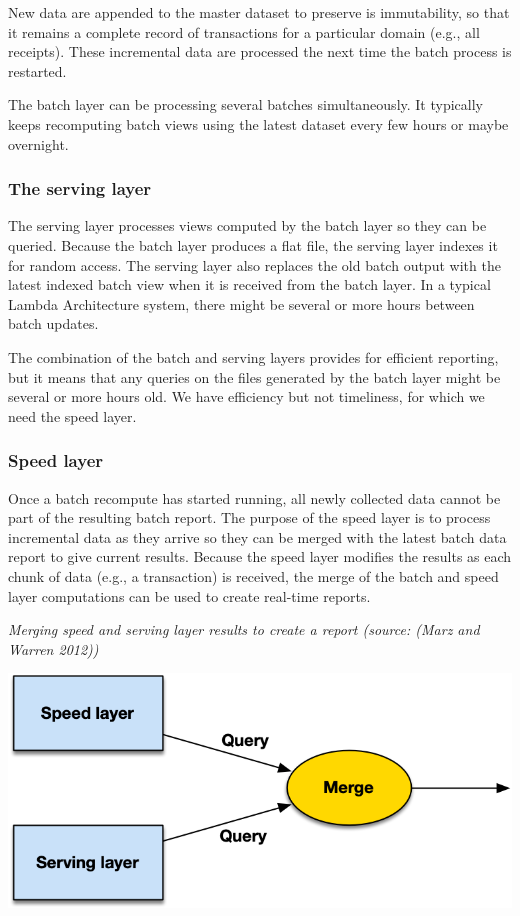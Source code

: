 \documentclass[
]{article}
\begin{document}
New data are appended to the master dataset to preserve is immutability,
so that it remains a complete record of transactions for a particular
domain (e.g., all receipts). These incremental data are processed the
next time the batch process is restarted.

The batch layer can be processing several batches simultaneously. It
typically keeps recomputing batch views using the latest dataset every
few hours or maybe overnight.

\hypertarget{the-serving-layer}{%
\subsubsection*{The serving layer}\label{the-serving-layer}}

The serving layer processes views computed by the batch layer so they
can be queried. Because the batch layer produces a flat file, the
serving layer indexes it for random access. The serving layer also
replaces the old batch output with the latest indexed batch view when it
is received from the batch layer. In a typical Lambda Architecture
system, there might be several or more hours between batch updates.

The combination of the batch and serving layers provides for efficient
reporting, but it means that any queries on the files generated by the
batch layer might be several or more hours old. We have efficiency but
not timeliness, for which we need the speed layer.

\hypertarget{speed-layer}{%
\subsubsection*{Speed layer}\label{speed-layer}}

Once a batch recompute has started running, all newly collected data
cannot be part of the resulting batch report. The purpose of the speed
layer is to process incremental data as they arrive so they can be
merged with the latest batch data report to give current results.
Because the speed layer modifies the results as each chunk of data
(e.g., a transaction) is received, the merge of the batch and speed
layer computations can be used to create real-time reports.

\emph{Merging speed and serving layer results to create a report (source:
(Marz and Warren 2012))}

\includegraphics{Figures/Chapter 18/merge-speed-serving.png}
\end{document}
